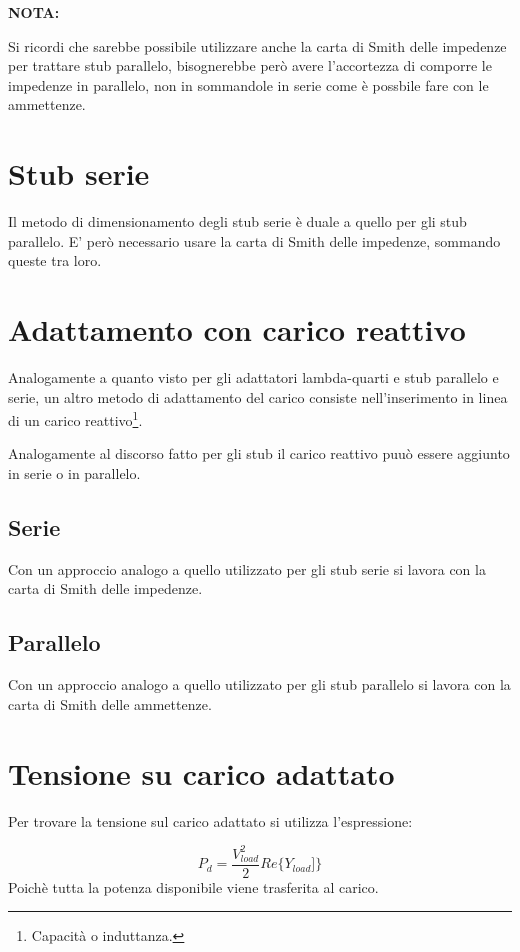 \documentclass[10pt,a4paper]{report}
\begin{document}
	\textbf{NOTA:}

	Si ricordi che sarebbe possibile utilizzare anche la carta di Smith delle impedenze per trattare stub parallelo, bisognerebbe però avere l'accortezza di comporre le impedenze in parallelo, non in sommandole in serie come è possbile fare con le ammettenze.

	
	\section{Stub serie}

	 	Il metodo di dimensionamento degli stub serie è duale a quello per gli stub parallelo. E' però necessario usare la carta di Smith delle impedenze, sommando queste tra loro.

		
	\section{Adattamento con carico reattivo}

		Analogamente a quanto visto per gli adattatori lambda-quarti e stub parallelo e serie, un altro metodo di adattamento del carico consiste nell'inserimento in linea di un carico reattivo\footnote{Capacità o induttanza.}.

		Analogamente al discorso fatto per gli stub il carico reattivo puuò essere aggiunto in serie o in parallelo.

		\subsection{Serie}
			Con un approccio analogo a quello utilizzato per gli stub serie si lavora con la carta di Smith delle impedenze.
		\subsection{Parallelo}
					Con un approccio analogo a quello utilizzato per gli stub parallelo si lavora con la carta di Smith delle ammettenze.

	\section{Tensione su carico adattato}

	Per trovare la tensione sul carico adattato si utilizza l'espressione:

	\[
	P_d= \frac {V_{load}^2}{2} Re\{ Y_{load}] \}
	\]
	Poichè tutta la potenza disponibile viene trasferita al carico.
\end{document}
